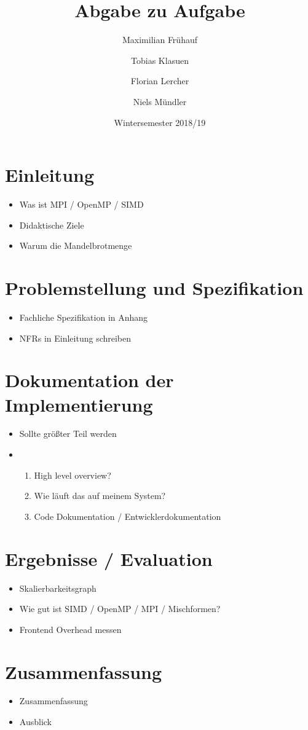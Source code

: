 \documentclass[course=erap]{aspdoc}
\author{Maximilian Frühauf \and Tobias Klasuen \and Florian Lercher \and Niels Mündler}
\title{Abgabe zu Aufgabe \theNumber}
\date{Wintersemester 2018/19}
\begin{document}
\maketitle

\section{Einleitung}
\begin{itemize}
	\item Was ist MPI / OpenMP / SIMD
	\item Didaktische Ziele
	\item Warum die Mandelbrotmenge
\end{itemize}

\section{Problemstellung und Spezifikation}
\begin{itemize}
	\item Fachliche Spezifikation in Anhang
	\item NFRs in Einleitung schreiben
\end{itemize}


\section{Dokumentation der Implementierung}
\begin{itemize}
	\item Sollte größter Teil werden
	\item \begin{enumerate}
		      \item High level overview?
		      \item Wie läuft das auf meinem System?
		      \item Code Dokumentation / Entwicklerdokumentation
	      \end{enumerate}
\end{itemize}

\section{Ergebnisse / Evaluation}
\begin{itemize}
	\item Skalierbarkeitsgraph
	\item Wie gut ist SIMD / OpenMP / MPI / Mischformen?
	\item Frontend Overhead messen
\end{itemize}

\section{Zusammenfassung}
\begin{itemize}
	\item Zusammenfassung
	\item Ausblick
\end{itemize}
\end{document}
